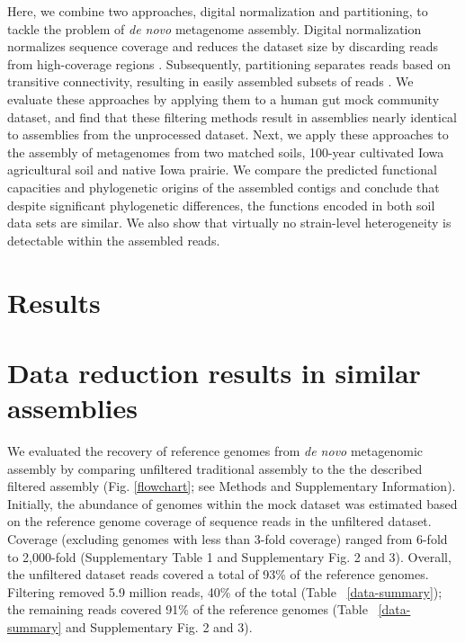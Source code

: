 \documentclass{nature}%
\begin{document}
Here, we combine two approaches, digital normalization and
partitioning, to tackle the problem of {\em de novo} metagenome
assembly.  Digital normalization normalizes sequence coverage and
reduces the dataset size by discarding reads from high-coverage
regions \cite{browndiginorm}.  Subsequently, partitioning separates
reads based on transitive connectivity, resulting in easily assembled
subsets of reads \cite{howeartifacts,Pell:2012cq}.  We evaluate these
approaches by applying them to a human gut mock community dataset, and
find that these filtering methods result in assemblies nearly
identical to assemblies from the unprocessed dataset.  Next, we apply
these approaches to the assembly of metagenomes from two matched soils,
100-year cultivated Iowa agricultural soil and native Iowa
prairie.  We compare the predicted functional capacities and
phylogenetic origins of the assembled contigs and conclude that
despite significant phylogenetic differences, the functions encoded in
both soil data sets are similar.  We also show that virtually no
strain-level heterogeneity is detectable within the assembled reads.

\section*{Results}

\section*{Data reduction results in similar assemblies}

We evaluated the recovery of reference genomes from {\em de novo}
metagenomic assembly by comparing unfiltered traditional assembly to
the the described filtered assembly (Fig. \ref{flowchart}; see Methods and
Supplementary Information). Initially, the abundance of genomes within the mock
dataset was estimated based on the reference genome coverage of
sequence reads in the unfiltered dataset.  Coverage (excluding genomes
with less than 3-fold coverage) ranged from 6-fold to 2,000-fold
(Supplementary Table 1 and Supplementary Fig. 2 and 3).  Overall, the
unfiltered dataset reads covered a total of 93\% of the reference
genomes.  Filtering removed 5.9 million reads, 40\% of the total (Table ~\ref{data-summary});  the remaining
reads covered 91\% of the reference genomes
(Table ~\ref{data-summary} and Supplementary Fig. 2 and 3).
\end{document}

